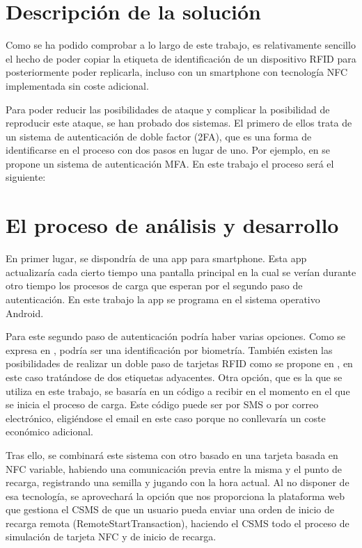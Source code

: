 \documentclass[12pt,a4paper,onecolumn,oneside]{report}
\begin{document}
\section{Descripción de la solución}

Como se ha podido comprobar a lo largo de este trabajo, es relativamente sencillo el hecho de poder copiar la etiqueta de identificación de un dispositivo RFID para posteriormente poder replicarla, incluso con un smartphone con tecnología NFC implementada sin coste adicional.

Para poder reducir las posibilidades de ataque y complicar la posibilidad de reproducir este ataque, se han probado dos sistemas. 
El primero de ellos trata de un sistema de autenticación de doble factor (2FA), que es una forma de identificarse en el proceso con dos pasos en lugar de uno. Por ejemplo, en \cite{eados} se propone un sistema de autenticación MFA. En este trabajo el proceso será el siguiente:

\section{El proceso de análisis y desarrollo}

En primer lugar, se dispondría de una app para smartphone. Esta app actualizaría cada cierto tiempo una pantalla principal en la cual se verían durante otro tiempo los procesos de carga que esperan por el segundo paso de autenticación. En este trabajo la app se programa en el sistema operativo Android.

Para este segundo paso de autenticación podría haber varias opciones. Como se expresa en \cite{eatrece}, podría ser una identificación por biometría. También existen las posibilidades de realizar un doble paso de tarjetas RFID como se propone en \cite{eacinco}, en este caso tratándose de dos etiquetas adyacentes. Otra opción, que es la que se utiliza en este trabajo, se basaría en un código a recibir en el momento en el que se inicia el proceso de carga. Este código puede ser por SMS o por correo electrónico, eligiéndose el email en este caso porque no conllevaría un coste económico adicional.

Tras ello, se combinará este sistema con otro basado en una tarjeta basada en NFC variable, habiendo una comunicación previa entre la misma y el punto de recarga, registrando una semilla y jugando con la hora actual. Al no disponer de esa tecnología, se aprovechará la opción que nos proporciona la plataforma web que gestiona el CSMS de que un usuario pueda enviar una orden de inicio de recarga remota (RemoteStartTransaction), haciendo el CSMS todo el proceso de simulación de tarjeta NFC y de inicio de recarga.
\end{document}
